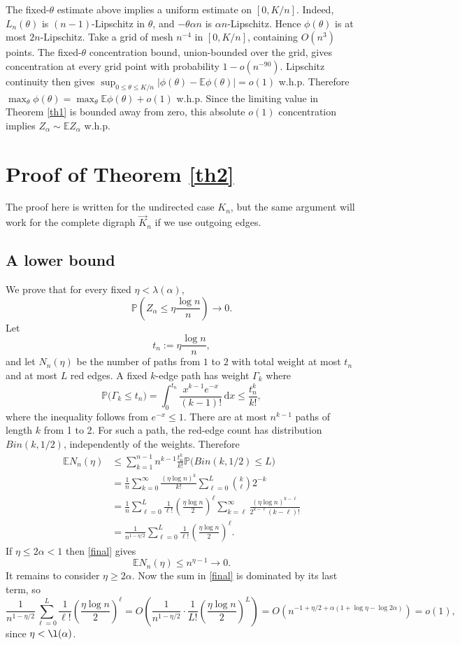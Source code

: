 \documentclass[12pt]{article}
\newcommand{\1}{\textbf{1}}
\def\nn{\nonumber}
\def\a{\alpha} \def\b{\beta} \def\d{\delta} \def\D{\Delta}
\def\G{\Gamma} \def\i{\iota} \def\k{\kappa}\def\K{\Kappa}
\newcommand{\brac}[1]{\left(#1\right)}
\newcommand{\bfrac}[2]{\left(\frac{#1}{#2}\right)}
\def\dd{\text{d}}
\def\E{\mathbb{E}}
\def\Pr{\mathbb{P}}
\def\nn{\nonumber}
\begin{document}
The fixed-\(\theta\) estimate above implies a uniform estimate on \([0,K/n]\). Indeed, \(L_n(\theta)\) is \((n-1)\)-Lipschitz in \(\theta\), and \(-\theta\alpha n\) is \(\alpha n\)-Lipschitz. Hence \(\phi(\theta)\) is at most \(2n\)-Lipschitz. Take a grid of mesh \(n^{-4}\) in \([0,K/n]\), containing \(O(n^3)\) points. The fixed-\(\theta\) concentration bound, union-bounded over the grid, gives concentration at every grid point with probability \(1-o(n^{-90})\). Lipschitz continuity then gives $\sup_{0\leq \theta\leq K/n}|\phi(\theta)-\E\phi(\theta)|=o(1)$ w.h.p. Therefore \(\max_\theta\phi(\theta)=\max_\theta\E\phi(\theta)+o(1)\) w.h.p. Since the limiting value in Theorem \ref{th1} is bounded away from zero, this absolute $o(1)$ concentration implies $Z_\a\sim \E Z_\a$ w.h.p.



\section{Proof of Theorem \ref{th2}}
The proof here is written for the undirected case $K_n$, but the same argument will work for the complete digraph $\vec K_n$ if we use outgoing edges.
\subsection{A lower bound}
We prove that for every fixed $\eta<\lambda(\a)$,
\[
  \Pr\!\left(Z_\a\le \eta\frac{\log n}{n}\right)\longrightarrow 0.
\]
Let
\[
  t_n:=\eta\frac{\log n}{n},
\]
and let $N_n(\eta)$ be the number of paths from $1$ to $2$ with total weight at most $t_n$ and at most $L$ red edges. A fixed $k$-edge path has weight $\G_k$ where
\[
  \Pr\bigl(\Gamma_k\le t_n\bigr) =\int_0^{t_n}\frac{x^{k-1}e^{-x}}{(k-1)!}\,\dd x  \le \frac{t_n^k}{k!},
\]
where the inequality follows from $e^{-x} \le 1$. 
There are at most $ n^{k-1}$ paths of length $k$ from 1 to 2.  For such a path, the red-edge count has distribution $Bin(k,1/2)$, independently of the weights.  Therefore
\begin{align}
  \E N_n(\eta)  &\le  \sum_{k=1}^{n-1} n^{k-1}\frac{t_n^k}{k!} \Pr\bigl(Bin(k,1/2)\le L\bigr) \nn \\
  &=  \frac1n\sum_{k=0}^{\infty}\frac{(\eta\log n)^k}{k!}\sum_{\ell=0}^L\binom{k}{\ell}2^{-k}\nn\\
&= \frac1n\sum_{\ell=0}^L\frac{1}{\ell!}\bfrac{\eta\log n}{2}^{\ell}\sum_{k=\ell}^\infty\frac{(\eta\log n)^{k-\ell}}{2^{k-\ell}(k-\ell)!}\nn\\
&=\frac1{n^{1-\eta/2}}\sum_{\ell=0}^L\frac{1}{\ell!}\bfrac{\eta\log n}{2}^{\ell}.\label{final}
\end{align}
If $\eta\le 2\a<1$ then \eqref{final} gives
\[
  \E N_n(\eta)\le n^{\eta-1}\to0.
\]
It remains to consider $\eta\geq2\a$. Now the sum in \eqref{final} is dominated by its last term, so
\[
\frac1{n^{1-\eta/2}}\sum_{\ell=0}^L\frac{1}{\ell!}\bfrac{\eta\log n}{2}^{\ell}=O\brac{\frac1{n^{1-\eta/2}}\cdot\frac{1}{L!}\bfrac{\eta\log n}{2}^{L}}=O(n^{-1+\eta/2+\a(1+\log\eta-\log 2\a)})=o(1),
\]
since $\eta<\l(\a)$.
\end{document}
